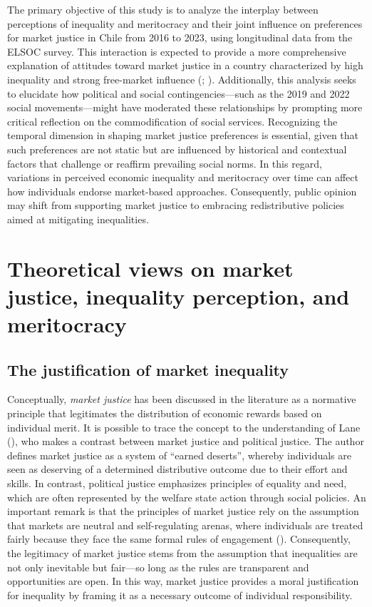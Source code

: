 \documentclass[
  12pt,
]{article}
\begin{document}
The primary objective of this study is to analyze the interplay between
perceptions of inequality and meritocracy and their joint influence on
preferences for market justice in Chile from 2016 to 2023, using
longitudinal data from the ELSOC survey. This interaction is expected to
provide a more comprehensive explanation of attitudes toward market
justice in a country characterized by high inequality and strong
free-market influence (;
). Additionally, this
analysis seeks to elucidate how political and social
contingencies---such as the 2019 and 2022 social movements---might have
moderated these relationships by prompting more critical reflection on
the commodification of social services. Recognizing the temporal
dimension in shaping market justice preferences is essential, given that
such preferences are not static but are influenced by historical and
contextual factors that challenge or reaffirm prevailing social norms.
In this regard, variations in perceived economic inequality and
meritocracy over time can affect how individuals endorse market-based
approaches. Consequently, public opinion may shift from supporting
market justice to embracing redistributive policies aimed at mitigating
inequalities.

\section{Theoretical views on market justice, inequality perception, and
meritocracy}\label{theoretical-views-on-market-justice-inequality-perception-and-meritocracy}

\subsection{The justification of market
inequality}\label{the-justification-of-market-inequality}

Conceptually, \emph{market justice} has been discussed in the literature
as a normative principle that legitimates the distribution of economic
rewards based on individual merit. It is possible to trace the concept
to the understanding of Lane (),
who makes a contrast between market justice and political justice. The
author defines market justice as a system of ``earned deserts'', whereby
individuals are seen as deserving of a determined distributive outcome
due to their effort and skills. In contrast, political justice
emphasizes principles of equality and need, which are often represented
by the welfare state action through social policies. An important remark
is that the principles of market justice rely on the assumption that
markets are neutral and self-regulating arenas, where individuals are
treated fairly because they face the same formal rules of engagement
(). Consequently, the
legitimacy of market justice stems from the assumption that inequalities
are not only inevitable but fair---so long as the rules are transparent
and opportunities are open. In this way, market justice provides a moral
justification for inequality by framing it as a necessary outcome of
individual responsibility.
\end{document}
